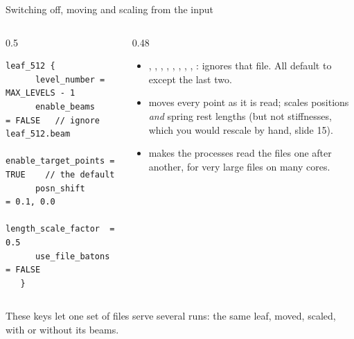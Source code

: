 \documentclass[aspectratio=169,11pt]{beamer}
\begin{document}
\begin{frame}[fragile]{Switching off, moving and scaling from the input}
\begin{columns}[T,onlytextwidth]
\begin{column}{0.5\textwidth}
\begin{lstlisting}[style=input,basicstyle=\ttfamily\tiny\color{BlackGray}]
   leaf_512 {
      level_number = MAX_LEVELS - 1
      enable_beams         = FALSE   // ignore leaf_512.beam
      enable_target_points = TRUE    // the default
      posn_shift           = 0.1, 0.0
      length_scale_factor  = 0.5
      use_file_batons      = FALSE
   }
\end{lstlisting}
\end{column}
\begin{column}{0.48\textwidth}
\small
\begin{itemize}
  \item {}, , , , , , , , :  ignores that file. All default to  except the last two.
  \item {} moves every point as it is read;  scales positions \emph{and} spring rest lengths (but not stiffnesses, which you would rescale by hand, slide 15).
  \item {} makes the processes read the files one after another, for very large files on many cores.
\end{itemize}
\end{column}
\end{columns}
\small These keys let one set of files serve several runs: the same leaf, moved, scaled, with or without its beams.
\end{frame}
\end{document}
